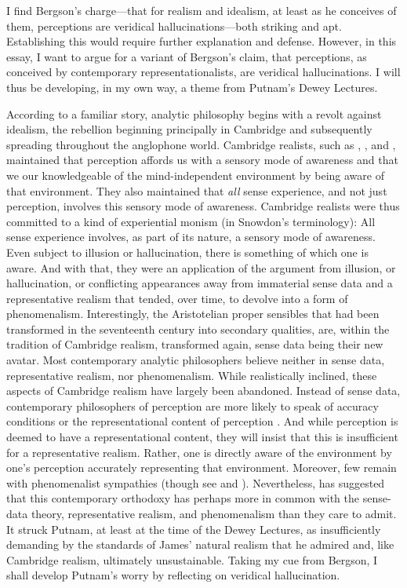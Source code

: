 \documentclass[12pt]{article}
\begin{document}
I find Bergson's charge---that for realism and idealism, at least as he conceives of them, perceptions are veridical hallucinations---both striking and apt. Establishing this would require further explanation and defense. However, in this essay, I want to argue for a variant of Bergson's claim, that perceptions, as conceived by contemporary representationalists, are veridical hallucinations. I will thus be developing, in my own way, a theme from Putnam's Dewey Lectures.

According to a familiar story, analytic philosophy begins with a revolt against idealism, the rebellion beginning principally in Cambridge and subsequently spreading throughout the anglophone world. Cambridge realists, such as \cite{Russell:1912uq}, \citet{Moore:1953nx}, and \citet{Price:1932fk}, maintained that perception affords us with a sensory mode of awareness and that we our knowledgeable of the mind-independent environment by being aware of that environment. They also maintained that \emph{all} sense experience, and not just perception, involves this sensory mode of awareness. Cambridge realists were thus committed to a kind of experiential monism (in Snowdon's \citeyear{Snowdon:2008oz} terminology): All sense experience involves, as part of its nature, a sensory mode of awareness. Even subject to illusion or hallucination, there is something of which one is aware. And with that, they were an application of the argument from illusion, or hallucination, or conflicting appearances away from immaterial sense data and a representative realism that tended, over time, to devolve into a form of phenomenalism. Interestingly, the Aristotelian proper sensibles that had been transformed in the seventeenth century into secondary qualities, are, within the tradition of Cambridge realism, transformed again, sense data being their new avatar. Most contemporary analytic philosophers believe neither in sense data, representative realism, nor phenomenalism. While realistically inclined, these aspects of Cambridge realism have largely been abandoned. Instead of sense data, contemporary philosophers of perception are more likely to speak of accuracy conditions or the representational content of perception \citep[though see][]{Robinson:1994ms}. And while perception is deemed to have a representational content, they will insist that this is insufficient for a representative realism. Rather, one is directly aware of the environment by one's perception accurately representing that environment. Moreover, few remain with phenomenalist sympathies (though see \citealt{Foster:2000ny} and \citealt{Noe:2004fk}). Nevertheless, \citet{Putnam:1994kx} has suggested that this contemporary orthodoxy has perhaps more in common with the sense-data theory, representative realism, and phenomenalism than they care to admit. It struck Putnam, at least at the time of the Dewey Lectures, as insufficiently demanding by the standards of James' natural realism that he admired and, like Cambridge realism, ultimately unsustainable. Taking my cue from Bergson, I shall develop Putnam's worry by reflecting on veridical hallucination.
\end{document}
